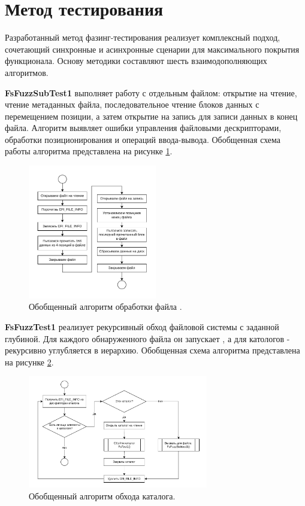 \section{Метод тестирования}

Разработанный метод фазинг-тестирования реализует комплексный подход, сочетающий синхронные и асинхронные сценарии для максимального покрытия функционала. Основу методики составляют шесть взаимодополняющих алгоритмов.

\textbf{FsFuzzSubTest1} выполняет работу с отдельным файлом: открытие на чтение, чтение метаданных файла, последовательное чтение блоков данных с перемещением позиции, а затем открытие на запись для записи данных в конец файла. Алгоритм выявляет ошибки управления файловыми дескрипторами, обработки позиционирования и операций ввода-вывода. Обобщенная схема работы алгоритма представлена на рисунке \ref{met:pic:fsfuzzsubtesti}.
\begin{figure}[htbp]
	\centering %
	\includegraphics[width=0.5\textwidth]{FsFuzzSubtestI.pdf} %
	\caption{Обобщенный алгоритм обработки файла .} %
	\label{met:pic:fsfuzzsubtesti} %
\end{figure}

\newpage
\textbf{FsFuzzTest1} реализует рекурсивный обход файловой системы с заданной глубиной. Для каждого обнаруженного файла он запускает , а для катологов - рекурсивно углубляется в иерархию. Обобщенная схема алгоритма представлена на рисунке \ref{met:pic:fsfuzztesti}.
\begin{figure}[htbp]
	\centering %
	\includegraphics[width=0.7\textwidth]{FsFuzzTestI.pdf} %
	\caption{Обобщенный алгоритм обхода каталога.} %
	\label{met:pic:fsfuzztesti} %
\end{figure}


